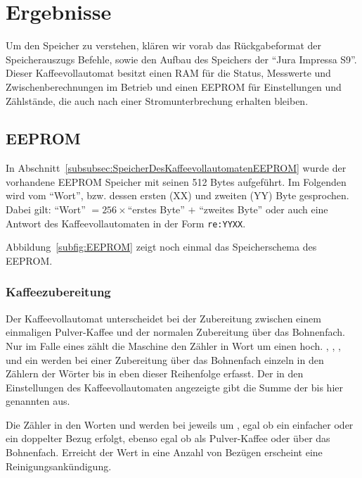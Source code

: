 \chapter{Ergebnisse} %

Um den Speicher zu verstehen, klären wir vorab das Rückgabeformat der Speicherauszugs Befehle, sowie den Aufbau des Speichers der "`Jura Impressa S9"'.
Dieser Kaffeevollautomat besitzt einen \ac{RAM} für die Status, Messwerte und Zwischenberechnungen im Betrieb und einen \ac{EEPROM} für Einstellungen und Zählstände, die auch nach einer Stromunterbrechung erhalten bleiben.

\section{EEPROM}
In Abschnitt~\ref{subsubsec:SpeicherDesKaffeevollautomatenEEPROM} wurde der vorhandene \acf{EEPROM} Speicher mit seinen 512 Bytes aufgeführt.
Im Folgenden wird vom "`Wort"', bzw. dessen ersten (XX) und zweiten (YY) Byte gesprochen.
Dabei gilt: "`Wort"' $= 256\times$"`erstes Byte"' $ + $ "`zweites Byte"' oder auch eine Antwort des Kaffeevollautomaten in der Form \texttt{re:YYXX}.

Abbildung~\ref{subfig:EEPROM} zeigt noch einmal das Speicherschema des \ac{EEPROM}.

\subsection{Kaffeezubereitung}\label{subsec:ErgebnisKaffeezubereitung}
Der Kaffeevollautomat unterscheidet bei der Zubereitung zwischen einem einmaligen Pulver-Kaffee und der normalen Zubereitung über das Bohnenfach.
Nur im Falle eines  zählt die Maschine den Zähler in Wort  um einen hoch.
, , ,  und ein  werden bei einer Zubereitung über das Bohnenfach einzeln in den Zählern der Wörter  bis  in eben dieser Reihenfolge erfasst.
Der in den Einstellungen des Kaffeevollautomaten angezeigte  gibt die Summe der bis hier genannten  aus.

Die Zähler in den Worten  und  werden bei  jeweils um , egal ob ein einfacher oder ein doppelter Bezug erfolgt, ebenso egal ob als Pulver-Kaffee oder über das Bohnenfach.
Erreicht der Wert in  eine Anzahl von  Bezügen erscheint eine Reinigungsankündigung.

